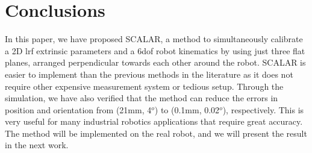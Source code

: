 \section{Conclusions}
\label{sec:conclusions}

In this paper, we have proposed SCALAR, a method to simultaneously calibrate a 2D \ac{lrf} extrinsic parameters and a 6\ac{dof} robot kinematics by using just three flat planes, arranged perpendicular towards each other around the robot. SCALAR is easier to implement than the previous methods in the literature as it does not require other expensive measurement system or tedious setup. Through the simulation, we have also verified that the method can reduce the errors in position and orientation from (21mm, 4$^o$) to (0.1mm, 0.02$^o$), respectively. This is very useful for many industrial robotics applications that require great accuracy. The method will be implemented on the real robot, and we will present the result in the next work. 
